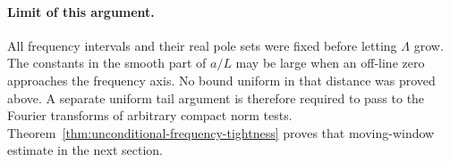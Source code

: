 \paragraph{Limit of this argument.}
All frequency intervals and their real pole sets were fixed before
letting $\Lambda$ grow.  The constants in the smooth part of
$a/L$ may be large when an off-line zero approaches the frequency
axis.  No bound uniform in that distance was proved above.  A
separate uniform tail argument is therefore required to pass to
the Fourier transforms of arbitrary compact norm tests.
Theorem~\ref{thm:unconditional-frequency-tightness} proves that
moving-window estimate in the next section.
